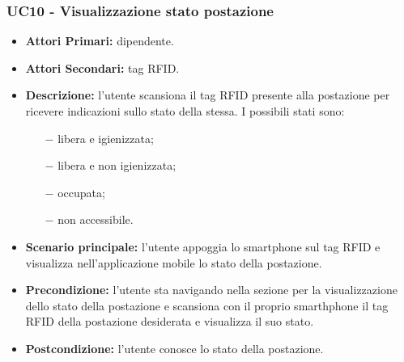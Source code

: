 \subsubsection{ UC10 - Visualizzazione stato postazione}
\begin{itemize}
	\item\textbf{Attori Primari:} dipendente.
	\item\textbf{Attori Secondari:} tag RFID.
	\item\textbf{Descrizione:} l’utente scansiona il tag RFID presente alla postazione per ricevere indicazioni sullo stato della stessa. I possibili stati sono:
	\begin{itemize}
		\item[$-$]libera e igienizzata;
		\item[$-$]libera e non igienizzata;
		\item[$-$]occupata;
		\item[$-$]non accessibile.
	\end{itemize}
	\item\textbf{Scenario principale:} l’utente appoggia lo smartphone sul tag RFID e visualizza nell'applicazione mobile lo stato della postazione.
	\item\textbf{Precondizione:} l’utente sta navigando nella sezione per la visualizzazione dello stato della postazione e 
	scansiona con il proprio smarthphone il tag RFID della postazione desiderata e visualizza il suo stato.
	\item\textbf{Postcondizione:} l’utente conosce lo stato della postazione.
\end{itemize}


